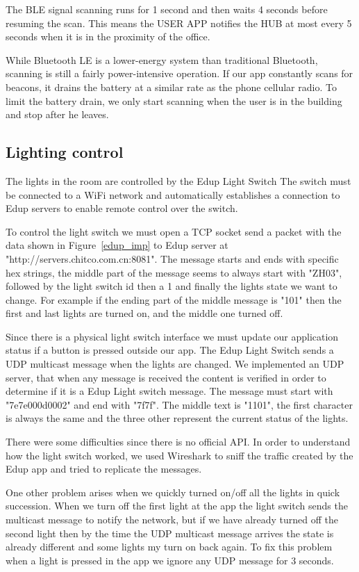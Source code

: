 The \ac{BLE} signal scanning runs for 1 second and then waits 4 seconds before resuming the scan. This means the USER APP notifies the HUB at most every 5 seconds when it is in the proximity of the office.

While Bluetooth LE is a lower-energy system than traditional Bluetooth, scanning is still a fairly power-intensive operation. If our app constantly scans for beacons, it drains the battery at a similar rate as the phone cellular radio. To limit the battery drain, we only start scanning when the user is in the building and stop after he leaves.

\subsection{Lighting control}\label{light_imp}


The lights in the room are controlled by the Edup Light Switch The switch must be connected to a WiFi network and automatically establishes a connection to Edup servers to enable remote control over the switch.

To control the light switch we must open a \ac{TCP} socket send a packet with the data shown in Figure~\ref{edup_imp} to Edup server at "http://servers.chitco.com.cn:8081".
The message starts and ends with specific hex strings, the middle part of the message seems to always start with "ZH03", followed by the light switch id then a 1 and finally the lights state we want to change. For example if the ending part of the middle message is "101" then the first and last lights are turned on, and the middle one turned off.

Since there is a physical light switch interface we must update our application status if a button is pressed outside our app.
The Edup Light Switch sends a \ac{UDP} multicast message when the lights are changed. We implemented an \ac{UDP} server, that when any message is received the content is verified in order to determine if it is a Edup Light switch message. The message must start with "7e7e000d0002" and end with "7f7f". The middle text is "1101", the first character is always the same and the three other represent the current status of the lights. 


There were some difficulties since there is no official API. In order to understand how the light switch worked, we used Wireshark to sniff the traffic created by the Edup app and tried to replicate the messages.

One other problem arises when we quickly turned on/off all the lights in quick succession. When we turn off the first light at the app the light switch sends the multicast message to notify the network, but if we have already turned off the second light then by the time the \ac{UDP} multicast message arrives the state is already different and some lights my turn on back again. To fix this problem when a light is pressed in the app we ignore any \ac{UDP} message for 3 seconds.


